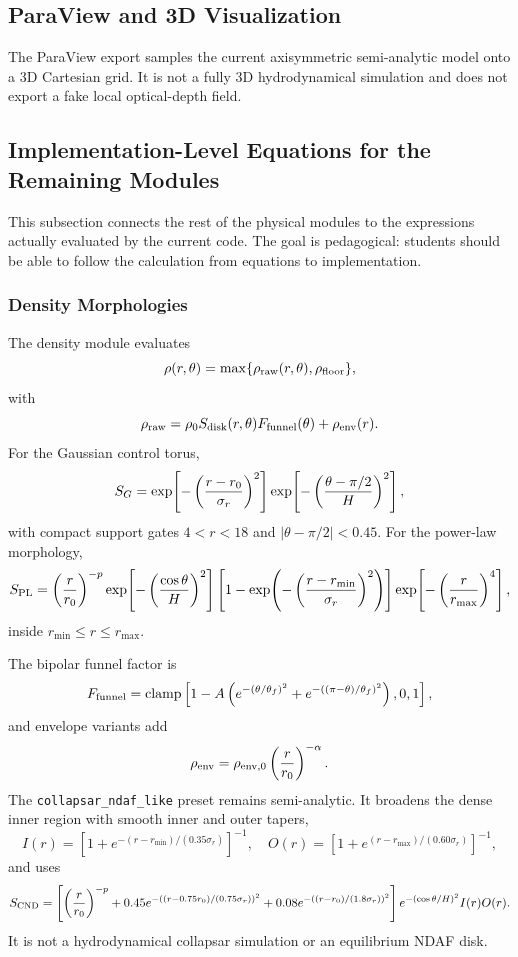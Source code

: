 \documentclass[11pt,a4paper]{article}
\begin{document}
\subsection{ParaView and 3D Visualization}

The ParaView export samples the current axisymmetric semi-analytic model onto a
3D Cartesian grid. It is not a fully 3D hydrodynamical simulation and does not
export a fake local optical-depth field.

\subsection{Implementation-Level Equations for the Remaining Modules}

This subsection connects the rest of the physical modules to the expressions
actually evaluated by the current code. The goal is pedagogical: students
should be able to follow the calculation from equations to implementation.

\subsubsection{Density Morphologies}

The density module evaluates
\[
\rho(r,\theta)=\max\{\rho_{\rm raw}(r,\theta),\rho_{\rm floor}\},
\]
with
\[
\rho_{\rm raw}=\rho_0 S_{\rm disk}(r,\theta)F_{\rm funnel}(\theta)
               +\rho_{\rm env}(r).
\]
For the Gaussian control torus,
\[
S_G=\exp\!\left[-\left({r-r_0\over \sigma_r}\right)^2\right]
    \exp\!\left[-\left({\theta-\pi/2\over H}\right)^2\right],
\]
with compact support gates $4<r<18$ and
$|\theta-\pi/2|<0.45$. For the power-law morphology,
\[
S_{\rm PL}=\left({r\over r_0}\right)^{-p}
\exp\!\left[-\left({\cos\theta\over H}\right)^2\right]
\left[1-\exp\!\left(-\left({r-r_{\min}\over \sigma_r}\right)^2\right)\right]
\exp\!\left[-\left({r\over r_{\max}}\right)^4\right],
\]
inside $r_{\min}\le r\le r_{\max}$.

The bipolar funnel factor is
\[
F_{\rm funnel}={\rm clamp}\left[
1-A\left(e^{-(\theta/\theta_f)^2}
        +e^{-((\pi-\theta)/\theta_f)^2}\right),0,1\right],
\]
and envelope variants add
\[
\rho_{\rm env}=\rho_{\rm env,0}\left({r\over r_0}\right)^{-\alpha}.
\]
The \texttt{collapsar\_ndaf\_like} preset remains semi-analytic. It broadens
the dense inner region with smooth inner and outer tapers,
\[
I(r)=\left[1+e^{-(r-r_{\min})/(0.35\sigma_r)}\right]^{-1},\quad
O(r)=\left[1+e^{(r-r_{\max})/(0.60\sigma_r)}\right]^{-1},
\]
and uses
\[
S_{\rm CND}=\left[
\left({r\over r_0}\right)^{-p}
 +0.45e^{-((r-0.75r_0)/(0.75\sigma_r))^2}
 +0.08e^{-((r-r_0)/(1.8\sigma_r))^2}
\right]e^{-(\cos\theta/H)^2}I(r)O(r).
\]
It is not a hydrodynamical collapsar simulation or an equilibrium NDAF disk.
\end{document}
